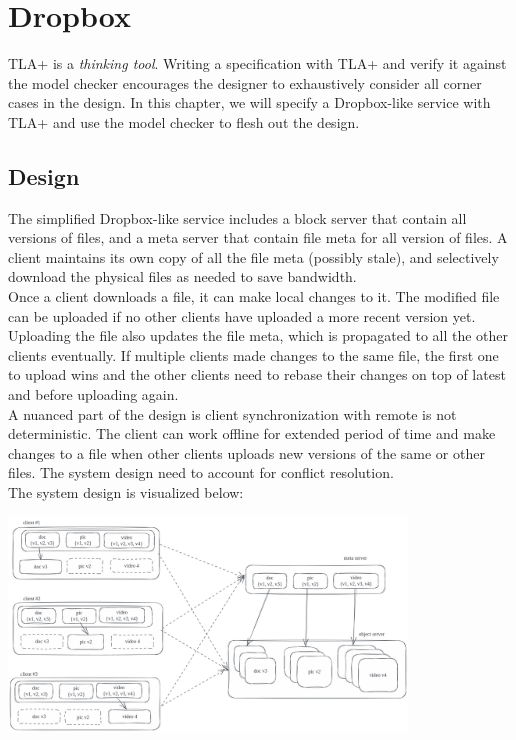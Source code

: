 % 

\usetikzlibrary{arrows.meta} %

\chapter{Dropbox}

TLA+ is a \textit{thinking tool}. Writing a specification with TLA+ and verify
it against the model checker encourages the designer to exhaustively consider
all corner cases in the design. In this chapter, we will specify a Dropbox-like
service with TLA+ and use the model checker to flesh out the design.\\

\section{Design}

The simplified Dropbox-like service includes a block server that contain all
versions of files, and a meta server that contain file meta for all version of
files. A client maintains its own copy of all the file meta (possibly stale), 
and selectively download the physical files as needed to save bandwidth.\\

Once a client downloads a file, it can make local changes to it. The modified
file can be uploaded if no other clients have uploaded a more recent version
yet.  Uploading the file also updates the file meta, which is propagated to all
the other clients eventually.  If multiple clients made changes to the same
file, the first one to upload wins and the other clients need to rebase their
changes on top of latest and before uploading again.\\

A nuanced part of the design is client synchronization with remote is not
deterministic. The client can work offline for extended period of time and make
changes to a file when other clients uploads new versions of the same or other
files. The system design need to account for conflict resolution.\\

The system design is visualized below:\\

\begin{center}
\includegraphics[width=300pt]{dropbox}
\end{center}

